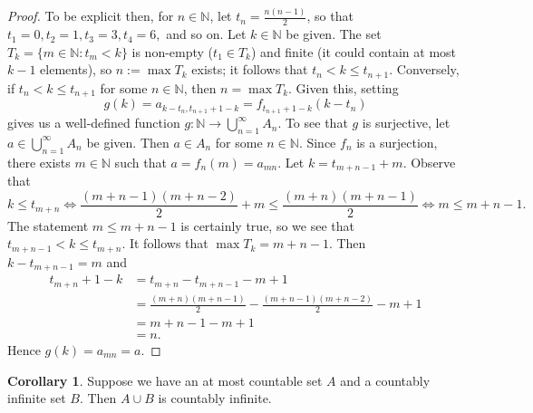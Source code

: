 \documentclass[12pt]{article}
\theoremstyle{definition}
\newtheorem{corollary}[definition]{Corollary}
\begin{document}
\begin{proof}
    \noindent To be explicit then, for \( n \in \mathbb{N} \), let \( t_n = \tfrac{n(n-1)}{2} \), so that \( t_1 = 0, t_2 = 1, t_3 = 3, t_4 = 6, \) and so on. Let \( k \in \mathbb{N} \) be given. The set \( T_k = \{ m \in \mathbb{N} : t_m < k \} \) is non-empty (\( t_1 \in T_k \)) and finite (it could contain at most \( k - 1 \) elements), so \( n := \max T_k \) exists; it follows that \( t_n < k \leq t_{n+1} \). Conversely, if \( t_n < k \leq t_{n+1} \) for some \( n \in \mathbb{N} \), then \( n = \max T_k \). Given this, setting
    \[
        g(k) = a_{k - t_n,t_{n+1} + 1 - k} = f_{t_{n+1} + 1 - k}(k - t_n)
    \]
    gives us a well-defined function \( g : \mathbb{N} \to \bigcup_{n=1}^{\infty} A_n \). To see that \( g \) is surjective, let \( a \in \bigcup_{n=1}^{\infty} A_n \) be given. Then \( a \in A_n \) for some \( n \in \mathbb{N} \). Since \( f_n \) is a surjection, there exists \( m \in \mathbb{N} \) such that \( a = f_n(m) = a_{mn} \). Let \( k = t_{m + n - 1} + m \). Observe that
    \[
        k \leq t_{m+n} \iff \frac{(m+n-1)(m+n-2)}{2} + m \leq \frac{(m+n)(m+n-1)}{2} \iff m \leq m + n - 1.
    \]
    The statement \( m \leq m + n - 1 \) is certainly true, so we see that \( t_{m+n-1} < k \leq t_{m+n} \). It follows that \( \max T_k = m + n - 1 \). Then \( k - t_{m+n-1} = m \) and
    \begin{align*}
        t_{m+n} + 1 - k &= t_{m+n} - t_{m+n-1} - m + 1 \\
        &= \frac{(m+n)(m+n-1)}{2} - \frac{(m+n-1)(m+n-2)}{2} - m + 1 \\
        &= m + n - 1 - m + 1 \\
        &= n.
    \end{align*}
    Hence \( g(k) = a_{mn} = a \).
\end{proof}

\begin{corollary}
\label{cor:union_of_amc_set_and_countable_set_is_countable}
    Suppose we have an at most countable set \( A \) and a countably infinite set \( B \). Then \( A \cup B \) is countably infinite.
\end{corollary}
\end{document}
